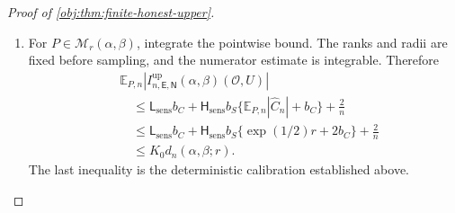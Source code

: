 \documentclass[11pt]{article}
\begin{document}
\begin{proof}[Proof of \cref{obj:thm:finite-honest-upper}]
\begin{enumerate}
For the rectangle points with
\[
c_{\mathrm{rect}},c_{\mathrm{rect}}'\in[c_-,c_+],
\qquad
s_{\mathrm{rect}},s_{\mathrm{rect}}'\in\{s_-,s_+\},
\]
we have
\[
|c_{\mathrm{rect}}-c_{\mathrm{rect}}'|\le2b_C,
\qquad
|c_{\mathrm{rect}}'|\le|\widehat C_n|+b_C,
\qquad
|s_{\mathrm{rect}}-s_{\mathrm{rect}}'|\le2b_S.
\]
Inserting the cross quotient with numerator
\(c_{\mathrm{rect}}'\) and denominator \(s_{\mathrm{rect}}\) yields
\[
\begin{aligned}
\left|
\frac{c_{\mathrm{rect}}}{s_{\mathrm{rect}}}
-
\frac{c_{\mathrm{rect}}'}{s_{\mathrm{rect}}'}
\right|
&\le
\frac{|c_{\mathrm{rect}}-c_{\mathrm{rect}}'|}
     {s_{\mathrm{rect}}}
+
\frac{|c_{\mathrm{rect}}'|
      |s_{\mathrm{rect}}-s_{\mathrm{rect}}'|}
     {s_{\mathrm{rect}}s_{\mathrm{rect}}'}\\
&\le
\frac{2b_C}{s_0}
+
\frac{2b_S(|\widehat C_n|+b_C)}{s_0^2}.
\end{aligned}
\]
It follows that every pairing of an upper-numerator corner and a lower-numerator corner satisfies the same difference bound. Choosing the corners attaining the maximum \(R\) and minimum \(L\), including either choice in a tie, gives
\[
R-L
\le
\mathsf L_{\mathrm{sens}}b_C
+
\mathsf H_{\mathrm{sens}}b_S(|\widehat C_n|+b_C).
\]
By \cref{obj:lem:fixed-budget-realization}, the literal rational output has additional length at most \(2/n\). Hence, pointwise,
\[
\left|
I^{\mathrm{up}}_{n,\mathsf E,\mathsf N}(\alpha,\beta)(\mathcal O,U)
\right|
\le
\mathsf L_{\mathrm{sens}}b_C
+
\mathsf H_{\mathrm{sens}}b_S(|\widehat C_n|+b_C)
+\frac2n.
\]

\item For \(P\in\mathcal M_r(\alpha,\beta)\), integrate the pointwise bound. The ranks and radii are fixed before sampling, and the numerator estimate is integrable. Therefore
\[
\begin{aligned}
&\mathbb E_{P,n}
\left|
I^{\mathrm{up}}_{n,\mathsf E,\mathsf N}(\alpha,\beta)(\mathcal O,U)
\right|\\
&\quad\le
\mathsf L_{\mathrm{sens}}b_C
+
\mathsf H_{\mathrm{sens}}b_S
 \{\mathbb E_{P,n}|\widehat C_n|+b_C\}
+\frac2n\\
&\quad\le
\mathsf L_{\mathrm{sens}}b_C
+
\mathsf H_{\mathrm{sens}}b_S
 \{\exp(1/2)r+2b_C\}
+\frac2n\\
&\quad\le K_0d_n(\alpha,\beta;r).
\end{aligned}
\]
The last inequality is the deterministic calibration established above.


\end{enumerate}
\end{proof}
\end{document}
